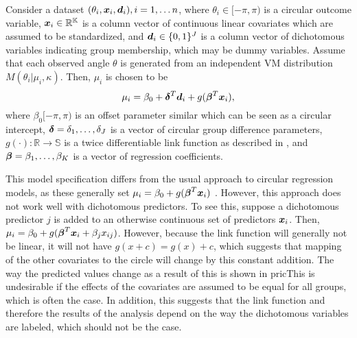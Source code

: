 \documentclass[10pt,a4paper]{article}\usepackage[]{graphicx}\usepackage[]{color}
\begin{document}
Consider a dataset \( (\theta_i, \boldsymbol{x}_i, \boldsymbol{d}_i), i = 1, \dots n \), where \( \theta_i \in [-\pi, \pi) \) is a circular outcome variable, \( \boldsymbol{x}_i \in \mathbb{R^K} \) is a column vector of continuous linear covariates which are assumed to be standardized, and \( \boldsymbol{d}_i \in \{0, 1\}^J \) is a column vector of dichotomous variables indicating group membership, which may be dummy variables. Assume that each observed angle $\theta$ is generated from an independent VM distribution \( M(\theta_i \vert \mu_i, \kappa) \). Then, \( \mu_i \) is chosen to be
\begin{equation}
\mu_i = \beta_0 + \boldsymbol{\delta}^T \boldsymbol{d}_i + g(\boldsymbol{\beta}^T \boldsymbol{x}_i),
\end{equation}
where \( \beta_0 [-\pi, \pi) \) is an offset parameter similar which can be seen as a circular intercept, \( \boldsymbol{\delta} = \delta_1, \dots, \delta_J \) is a vector of circular group difference parameters, \( g(\cdot) : \mathbb{R} \rightarrow \mathbb{S} \) is a twice differentiable link function as described in \citet{fisher1992regression}, and \(\boldsymbol{\beta} = \beta_1, \dots, \beta_K \) is a vector of regression coefficients.

This model specification differs from the usual approach to circular regression models, as these generally set \( \mu_i = \beta_0 + g(\boldsymbol{\beta}^T \boldsymbol{x}_i)\) \citep{fisher1992regression, gill2010, lagona2014regression}. However, this approach does not work well with dichotomous predictors. To see this, suppose a dichotomous predictor \( j \) is added to an otherwise continuous set of predictors \( \boldsymbol{x}_i \). Then, \( \mu_i = \beta_0 + g(\boldsymbol{\beta}^T \boldsymbol{x}_i + \beta_j x_{ij} ) \). However, because the link function will generally not be linear, it will not have \( g(x + c) = g(x) + c \), which suggests that mapping of the other covariates to the circle will change by this constant addition. The way the predicted values change as a result of this is shown in pricThis is undesirable if the effects of the covariates are assumed to be equal for all groups, which is often the case. In addition, this suggests that the link function and therefore the results of the analysis depend on the way the dichotomous variables are labeled, which should not be the case.
\end{document}
